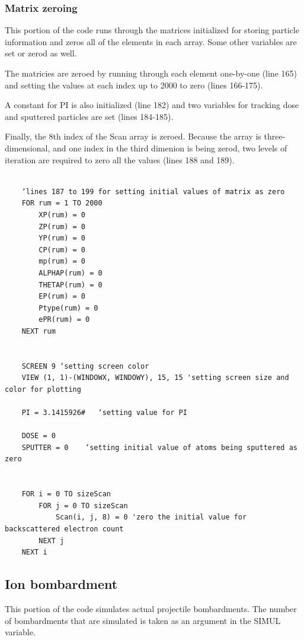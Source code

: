 \documentclass[10pt, reqno]{exam}
\begin{document}
\subsubsection{Matrix zeroing}  

This portion of the code runs through the matrices initialized for storing particle information and zeros all of the elements in each array. Some other variables are set or zerod as well. \par

The matricies are zeroed by running through each element one-by-one (line 165) and setting the values at each index up to 2000 to zero (lines 166-175). \par

A constant for PI is also initialized (line 182) and two variables for tracking dose and sputtered particles are set (lines 184-185). \par

Finally, the 8th index of the Scan  array is zeroed. Because the array is three-dimensional, and one index in the third dimenion is being zerod, two levels of iteration are required to zero all the values (lines 188 and 189). \par

\begin{verbatim}

    ‘lines 187 to 199 for setting initial values of matrix as zero
    FOR rum = 1 TO 2000
        XP(rum) = 0
        ZP(rum) = 0
        YP(rum) = 0
        CP(rum) = 0
        mp(rum) = 0
        ALPHAP(rum) = 0
        THETAP(rum) = 0
        EP(rum) = 0
        Ptype(rum) = 0
        ePR(rum) = 0
    NEXT rum
    
    
    SCREEN 9 ‘setting screen color
    VIEW (1, 1)-(WINDOWX, WINDOWY), 15, 15 'setting screen size and color for plotting
    
    PI = 3.1415926#   ‘setting value for PI
    
    DOSE = 0
    SPUTTER = 0    ‘setting initial value of atoms being sputtered as zero
    
    
    FOR i = 0 TO sizeScan
        FOR j = 0 TO sizeScan
            Scan(i, j, 8) = 0 'zero the initial value for backscattered electron count
        NEXT j
    NEXT i
\end{verbatim}
\subsection{Ion bombardment}
\label{sec:ion bombardment}
This portion of the code simulates actual projectile bombardments. The number of bombardments that are simulated is taken as an argument in the SIMUL variable.
\end{document}
